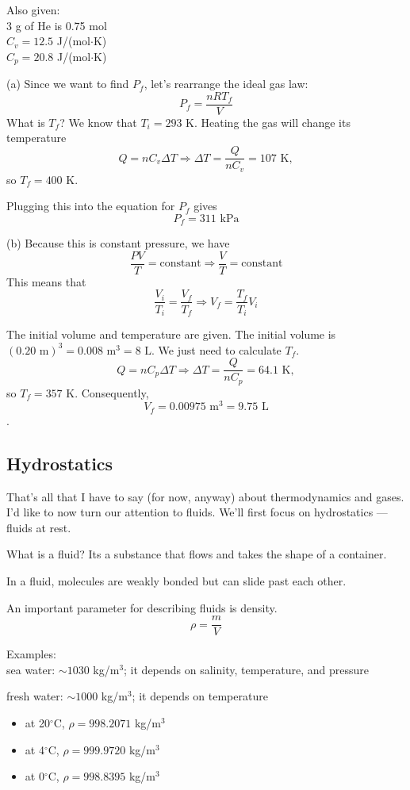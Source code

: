 Also given:\\
3 g of He is 0.75 mol\\
$C_v=12.5$ J/(mol$\cdot$K)\\
$C_p=20.8$ J/(mol$\cdot$K)

(a) Since we want to find $P_f$, let's rearrange the ideal gas law:
$$P_f = \frac{nRT_f}{V}$$
What is $T_f$? We know that $T_i=293\mbox{ K}$. Heating the gas will change its temperature
$$Q=nC_v\Delta{T}\Rightarrow \Delta{T}=\frac{Q}{nC_v}=107\mbox{ K},$$
so $T_f=400$ K.

Plugging this into the equation for $P_f$ gives
$$\boxed{P_f=311\mbox{ kPa}}$$

(b) Because this is constant pressure, we have
$$\frac{PV}{T}=\mbox{constant}\Rightarrow \frac{V}{T}=\mbox{constant}$$
This means that
$$\frac{V_i}{T_i}=\frac{V_f}{T_f}\Rightarrow V_f=\frac{T_f}{T_i}V_i$$

The initial volume and temperature are given. The initial volume is $(0.20\mbox{ m})^3=0.008\mbox{ m}^3=8\mbox{ L}$. We just need to calculate $T_f$.
$$Q=nC_p\Delta{T}\Rightarrow \Delta{T}=\frac{Q}{nC_p}=64.1\mbox{ K},$$
so $T_f=357\mbox{ K}$. Consequently, 
$$\boxed{V_f=0.00975\mbox{ m}^3=9.75\mbox{ L}}$$.

\subsection{Hydrostatics}
That's all that I have to say (for now, anyway) about thermodynamics and gases. I'd like to now turn our attention to fluids. We'll first focus on hydrostatics --- fluids at rest.

What is a fluid? Its a substance that flows and takes the shape of a container.

\vspace{5cm}

In a fluid, molecules are weakly bonded but can slide past each other.

An important parameter for describing fluids is density.
$$\rho=\frac{m}{V}$$


Examples:\\
sea water: $\sim 1030$ kg/m$^3$; it depends on salinity, temperature, and pressure

fresh water: $\sim 1000$ kg/m$^3$; it depends on temperature\\
\begin{itemize}
\item at 20$^\circ$C, $\rho=998.2071$ kg/m$^3$
\item at 4$^\circ$C, $\rho=999.9720$ kg/m$^3$
\item at 0$^\circ$C, $\rho=998.8395$ kg/m$^3$
\end{itemize} 

